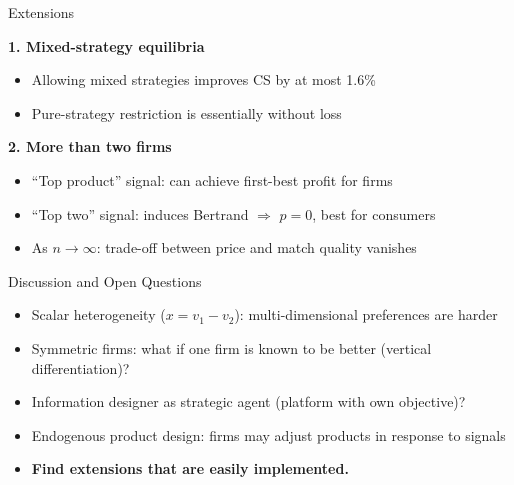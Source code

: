 \documentclass[aspectratio=169, 11pt]{beamer}
\begin{document}
\begin{frame}{Extensions}

\textbf{1. Mixed-strategy equilibria}
\begin{itemize}
    \item Allowing mixed strategies improves CS by at most 1.6\%
    \item Pure-strategy restriction is essentially without loss
\end{itemize}

\bigskip

\textbf{2. More than two firms}
\begin{itemize}
    \item ``Top product'' signal: can achieve first-best profit for firms
    \item ``Top two'' signal: induces Bertrand $\Rightarrow$ $p = 0$, best for consumers
    \item As $n \to \infty$: trade-off between price and match quality vanishes
\end{itemize}

\end{frame}

\begin{frame}{Discussion and Open Questions}

\begin{itemize}
    \item Scalar heterogeneity ($x = v_1 - v_2$): multi-dimensional preferences are harder

    \bigskip

    \item Symmetric firms: what if one firm is known to be better (vertical differentiation)?

    \bigskip

    \item Information designer as strategic agent (platform with own objective)?

    \bigskip

    \item Endogenous product design: firms may adjust products in response to signals
    \item \textbf{Find extensions that are easily implemented.}
    \end{itemize}

\end{frame}
\end{document}
